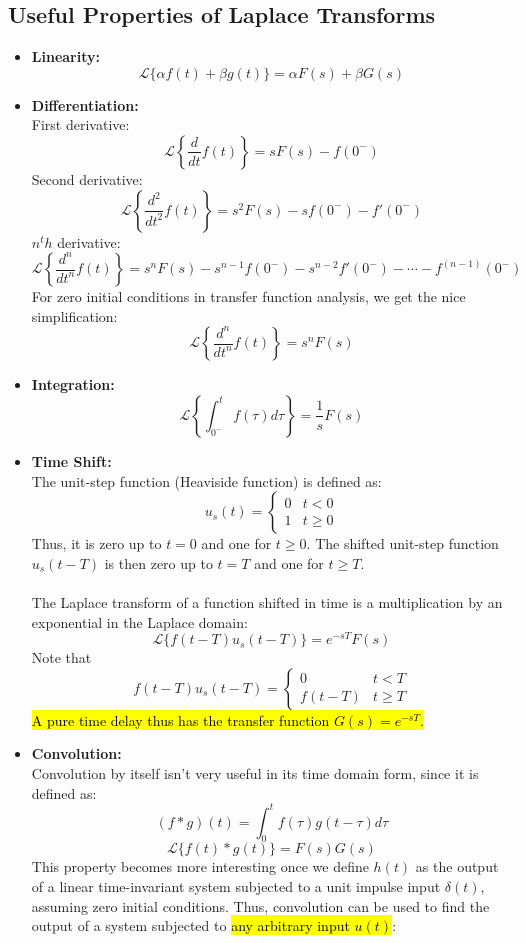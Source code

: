 ﻿\documentclass[12pt]{article}
\begin{document}
\subsection*{Useful Properties of Laplace Transforms}
\begin{itemize}
    \item \textbf{Linearity:} \[\mathcal{L} \{\alpha f(t) + \beta g(t)\} = \alpha F(s) + \beta G(s)\]
    \item \textbf{Differentiation:}\\
    First derivative: \[\mathcal{L} \left\{\frac{d}{dt}f(t)\right\} = sF(s) - f(0^-)\]
    Second derivative: \[\mathcal{L} \left\{\frac{d^2}{dt^2}f(t)\right\} = s^2F(s) - sf(0^-) - f'(0^-)\]
    $n^th$ derivative: \[\mathcal{L} \left\{\frac{d^n}{dt^n}f(t)\right\} = s^nF(s) - s^{n-1}f(0^-) - s^{n-2}f'(0^-) - \cdots - f^{(n-1)}(0^-)\]
    For zero initial conditions in transfer function analysis, we get the nice simplification:
    \[\mathcal{L} \left\{\frac{d^n}{dt^n}f(t)\right\} = s^nF(s)\]
    \item \textbf{Integration:}
    \[\mathcal{L}\left\{\int_{0^-}^t f(\tau)d\tau\right\} = \frac{1}{s}F(s)\]
    \item \textbf{Time Shift:}\\
    The unit-step function (Heaviside function) is defined as:
    \[u_s(t) = \begin{cases} 0 & t < 0 \\ 1 & t \geq 0 \end{cases}\]
    Thus, it is zero up to $t=0$ and one for $t\geq 0$. The shifted unit-step function $u_s(t-T)$ is then zero up to $t=T$ and one for $t\geq T$.\\\\
    The Laplace transform of a function shifted in time is a multiplication by an exponential in the Laplace domain:
    \[\mathcal{L}\{f(t-T)u_s(t-T)\} = e^{-sT}F(s)\]
    Note that
    \[f(t-T)u_s(t-T) = \begin{cases} 0 & t < T \\ f(t-T) & t \geq T \end{cases}\]
    \hl{A pure time delay thus has the transfer function $G(s) = e^{-sT}$.}
    \item \textbf{Convolution:}\\
    Convolution by itself isn't very useful in its time domain form, since it is defined as:
    \[(f * g)(t) = \int_{0}^{t} f(\tau)g(t - \tau)d\tau\]
    \[\mathcal{L}\{f(t) * g(t)\} = F(s)G(s)\]
    This property becomes more interesting once we define $h(t)$ as the output of a linear time-invariant system subjected to a unit impulse input $\delta(t)$, assuming zero initial conditions. Thus, convolution can be used to find the output of a system subjected to \hl{any arbitrary input $u(t)$}:

\end{itemize}
\end{document}
